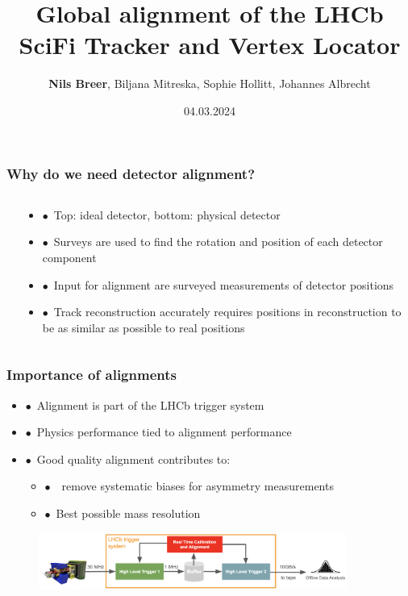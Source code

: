 \documentclass[aspectratio=1610, 12pt, xcolor=dvipsnames]{beamer}
\title{Global alignment of the LHCb SciFi Tracker and Vertex Locator}
\author[N.Breer]{\textbf{Nils Breer}, Biljana Mitreska, Sophie Hollitt, Johannes Albrecht}
\institute{DPG Conference, Karlsruhe}
\date{04.03.2024}
\begin{document}
\maketitle

\begin{frame}\frametitle{Why do we need detector alignment?}
  \begin{columns}
    \begin{column}[c]{0.5\textwidth}
      
    \end{column}
    \begin{column}[c]{0.5\textwidth}
      \begin{itemize}
        \item $\bullet$\, Top: ideal detector, bottom: physical detector
        \item $\bullet$\, Surveys are used to find the rotation and position of each detector component
        \item $\bullet$\, Input for alignment are surveyed measurements of detector positions
        \item $\bullet$\, Track reconstruction accurately requires positions in reconstruction to be as similar as possible to real positions
      \end{itemize}
    \end{column}
  \end{columns}
\end{frame}

\begin{frame}\frametitle{Importance of alignments}
  \begin{itemize}
    \item $\bullet$\, Alignment is part of the LHCb trigger system
    \item $\bullet$\, Physics performance tied to alignment performance
    \item $\bullet$\, Good quality alignment contributes to:
    \begin{itemize}
      \item $\bullet$\, \to\, remove systematic biases for asymmetry measurements
      \item $\bullet$\, Best possible mass resolution
    \end{itemize}
  \end{itemize}
  \begin{figure}
      \includegraphics[width=0.9\textwidth]{logos/dataflow.png}%
  \end{figure}
\end{frame}
\end{document}
